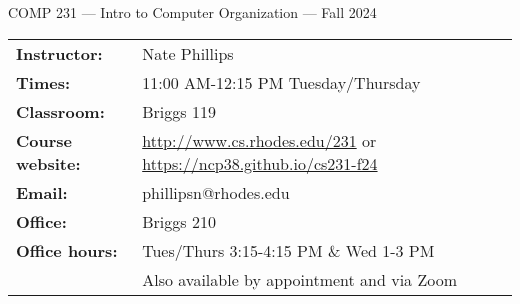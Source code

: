 \documentclass [letterpaper,11pt]{article}
\begin{document}
\begin{center}
\large COMP 231 --- Intro to Computer Organization --- Fall 2024
\end{center}

\noindent\begin{tabular}{@{}ll}
\textbf{Instructor:} & Nate Phillips \\
\textbf{Times:} & 11:00 AM-12:15 PM Tuesday/Thursday\\
\textbf{Classroom:} & Briggs 119 \\
\textbf{Course website:} & \url{http://www.cs.rhodes.edu/231} or \url{https://ncp38.github.io/cs231-f24}\\
\textbf{Email:} & phillipsn@rhodes.edu\\
\textbf{Office:} & Briggs 210\\
\textbf{Office hours:} & Tues/Thurs 3:15-4:15 PM \& Wed 1-3 PM \\ &Also available by appointment and via Zoom\\
\end{tabular}
\end{document}
